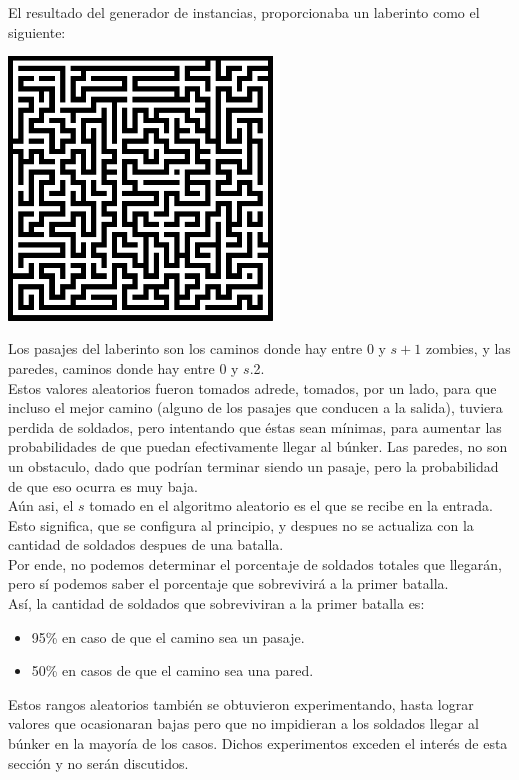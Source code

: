 El resultado del generador de instancias, proporcionaba un laberinto como el siguiente:

\begin{center}
\includegraphics[width=7cm,keepaspectratio=yes]{imagenes/ej2/maze.png}
\end{center}

Los pasajes del laberinto son los caminos donde hay entre $0$ y $s+1$ zombies, y las paredes, caminos donde hay entre $0$ y $s$.2.\\
Estos valores aleatorios fueron tomados adrede, tomados, por un lado, para que incluso el mejor camino (alguno de los pasajes que conducen a la salida), tuviera perdida de soldados, pero intentando que éstas sean mínimas, para aumentar las probabilidades de que puedan efectivamente llegar al búnker.
Las paredes, no son un obstaculo, dado que podrían terminar siendo un pasaje, pero la probabilidad de que eso ocurra es muy baja.\\
Aún asi, el $s$ tomado en el algoritmo aleatorio es el que se recibe en la entrada. Esto significa, que se configura al principio, y despues no se actualiza con la cantidad de soldados despues de una batalla.\\
Por ende, no podemos determinar el porcentaje de soldados totales que llegarán, pero sí podemos saber el porcentaje que sobrevivirá a la primer batalla.\\
Así, la cantidad de soldados que sobreviviran a la primer batalla es:
\begin{itemize}
	\item 95\% en caso de que el camino sea un pasaje.
	\item 50\% en casos de que el camino sea una pared.
\end{itemize}
Estos rangos aleatorios también se obtuvieron experimentando, hasta lograr valores que ocasionaran bajas pero que no impidieran a los soldados llegar al búnker en la mayoría de los casos. Dichos experimentos exceden el interés de esta sección y no serán discutidos.\\

